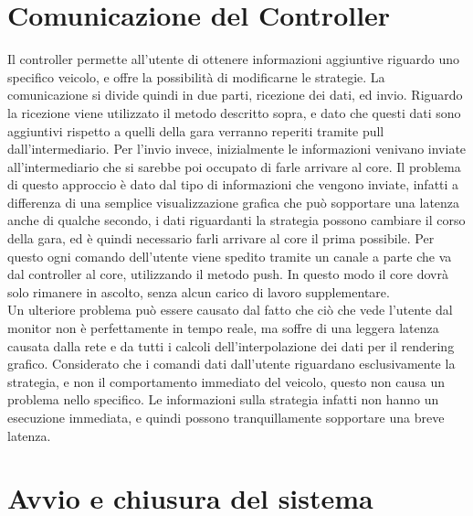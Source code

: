
\section{Comunicazione del Controller}

Il controller permette all’utente di ottenere informazioni aggiuntive riguardo uno specifico veicolo, e offre la possibilità di modificarne le strategie.
La comunicazione si divide quindi in due parti, ricezione dei dati, ed invio.
Riguardo la ricezione viene utilizzato il metodo descritto sopra, e dato che questi dati sono aggiuntivi rispetto a quelli della gara verranno reperiti tramite pull dall’intermediario.
Per l’invio invece, inizialmente le informazioni venivano inviate all’intermediario che si sarebbe poi  occupato di farle arrivare al core. Il problema di questo approccio è dato dal tipo di informazioni che vengono inviate, infatti a differenza di una semplice visualizzazione grafica che può sopportare una latenza anche di qualche secondo, i dati riguardanti la strategia possono cambiare il corso della gara, ed è quindi necessario farli arrivare al core il prima possibile. %
Per questo ogni comando dell’utente viene spedito tramite un canale a parte che va dal controller al core, utilizzando il metodo push. In questo modo il core dovrà solo rimanere in ascolto, senza alcun carico di lavoro supplementare.  \\
Un ulteriore problema può essere causato dal fatto che ciò che vede l’utente dal monitor non è perfettamente in tempo reale, ma soffre di una leggera latenza causata dalla rete e da tutti i calcoli dell’interpolazione dei dati per il rendering grafico. Considerato che i comandi dati dall’utente riguardano esclusivamente la strategia, e non il comportamento immediato del veicolo, questo non causa un problema nello specifico. Le informazioni sulla strategia infatti non hanno un esecuzione immediata, e quindi possono tranquillamente sopportare una breve latenza.


\section{Avvio e chiusura del sistema}

